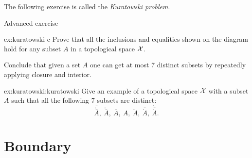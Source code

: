

The following exercise is called the \emph{Kuratowski problem}.

\begin{thm}{Advanced exercise}\label{ex:kuratowski}

\begin{subthm}{ex:kuratowski-c}
Prove that all the inclusions and equalities shown on the diagram hold for any subset $A$ in a topological space $\mathcal{X}$.
\begin{figure}[h!]
\centering
{}
\end{figure}

Conclude that given a set $A$ one can get at most 7 distinct subsets by repeatedly applying closure and interior.
\end{subthm}

\begin{subthm}{ex:kuratowski:kuratowski}
Give an example of a topological space $\mathcal{X}$ with a subset $A$ such that all the following 7 subsets are distinct:
\[\bar{\mathring{\bar A}},\ \mathring{\bar A},\ \bar A,\  A,\  \mathring A,\ \bar{\mathring A},\ \mathring{\bar{\mathring A}}.\]
\end{subthm}


\end{thm}


\section{Boundary}

